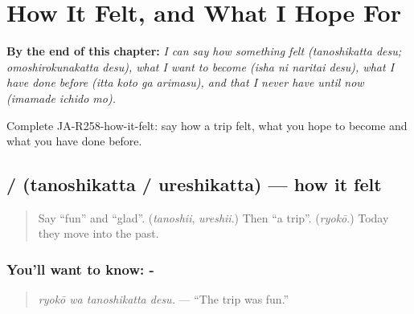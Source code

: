 
\chapter{How It Felt, and What I Hope For}
\label{ch:ja-how-it-felt-and-what-i-hope-for}

\begin{chapteropening}
\textbf{By the end of this chapter:} \emph{I can say how something felt (tanoshikatta desu; omoshirokunakatta desu), what I want to become (isha ni naritai desu), what I have done before (itta koto ga arimasu), and that I never have until now (imamade ichido mo).}

Complete JA-R258-how-it-felt: say how a trip felt, what you hope to become and what you have done before.
\end{chapteropening}

\section[\texorpdfstring{\ja{たのしかった} … (tanoshikatta …)}{たのしかった … (tanoshikatta …)}]{ /  (tanoshikatta / ureshikatta) — how it felt}

\label{lesson:JA-C258-tanoshikatta}



\begin{quote}
Say \textquotedblleft{}fun\textquotedblright{} and \textquotedblleft{}glad\textquotedblright{}. (\emph{tanoshii}, \emph{ureshii}.) Then \textquotedblleft{}a trip\textquotedblright{}. (\emph{ryokō}.) Today they move into the past.
\end{quote}

\subsection*{You'll want to know: -}
\begin{quote}
\textbf{ }
\end{quote}

\begin{quote}
\emph{ryokō wa tanoshikatta desu.} — \textquotedblleft{}The trip was fun.\textquotedblright{}
\end{quote}

